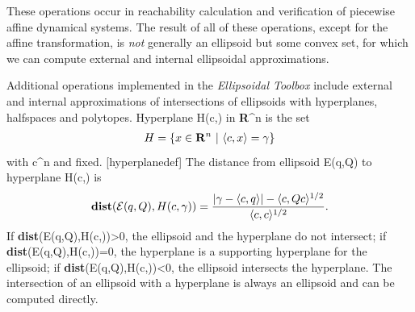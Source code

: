 \documentclass[letterpaper,10pt,english]{sphinxmanual}
\begin{document}
These operations occur in reachability calculation and verification of
piecewise affine dynamical systems. The result of all of these
operations, except for the affine transformation, is \emph{not} generally an
ellipsoid but some convex set, for which we can compute external and
internal ellipsoidal approximations.

Additional operations implemented in the \emph{Ellipsoidal Toolbox} include
external and internal approximations of intersections of ellipsoids with
hyperplanes, halfspaces and polytopes. Hyperplane H(c,\gamma) in
{\bf R}^n is the set
\begin{gather}
\begin{split}H = \{x\in{\bf R}^n ~|~ \langle c, x\rangle = \gamma\}
\label{hyperplane}\end{split}\notag
\end{gather}
with c^n and \gamma{} fixed.
{[}hyperplanedef{]} The distance from ellipsoid {\mathcal E}(q,Q) to
hyperplane H(c,\gamma) is
\begin{gather}
\begin{split}{\bf dist}({\mathcal E}(q,Q),H(c,\gamma)) =
\frac{\left|\gamma-\langle c,q\rangle\right| -
\langle c,Qc\rangle^{1/2}}{\langle c,c\rangle^{1/2}}. \label{dist_hp}\end{split}\notag
\end{gather}
If {\bf dist}({\mathcal E}(q,Q),H(c,\gamma))>0, the ellipsoid
and the hyperplane do not intersect; if
{\bf dist}({\mathcal E}(q,Q),H(c,\gamma))=0, the hyperplane is a
supporting hyperplane for the ellipsoid; if
{\bf dist}({\mathcal E}(q,Q),H(c,\gamma))<0, the ellipsoid
intersects the hyperplane. The intersection of an ellipsoid with a
hyperplane is always an ellipsoid and can be computed directly.
\end{document}
